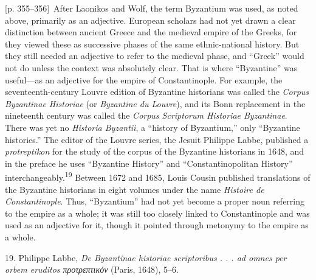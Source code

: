 \documentclass[10pt,a4paper]{article}
\begin{document}
{\scriptsize\color{gray}[p. 355–356]}\ After Laonikos and Wolf, the term Byzantium was used, as noted above, primarily as an adjective. European scholars had not yet drawn a clear distinction between ancient Greece and the medieval empire of the Greeks, for they viewed these as successive phases of the same ethnic-national history. But they still needed an adjective to refer to the medieval phase, and “Greek” would not do unless the context was absolutely clear. That is where “Byzantine” was useful—as an adjective for the empire of Constantinople. For example, the seventeenth-century Louvre edition of Byzantine historians was called the \textit{Corpus Byzantinae Historiae} (or \textit{Byzantine du Louvre}), and its Bonn replacement in the nineteenth century was called the \textit{Corpus Scriptorum Historiae Byzantinae}. There was yet no \textit{Historia Byzantii}, a “history of Byzantium,” only “Byzantine histories.” The editor of the Louvre series, the Jesuit Philippe Labbe, published a \textit{protreptikon} for the study of the corpus of the Byzantine historians in 1648, and in the preface he uses “Byzantine History” and “Constantinopolitan History” interchangeably.\nobreak\textsuperscript{19} Between 1672 and 1685, Louis Cousin published translations of the Byzantine historians in eight volumes under the name \textit{Histoire de Constantinople}. Thus, “Byzantium” had not yet become a proper noun referring to the empire as a whole; it was still too closely linked to Constantinople and was used as an adjective for it, though it pointed through metonymy to the empire as a whole.\par{\small 19. Philippe Labbe, \textit{De Byzantinae historiae scriptoribus . . . ad omnes per orbem eruditos προτρεπτικόν }(Paris, 1648), 5–6.\par}
\end{document}
